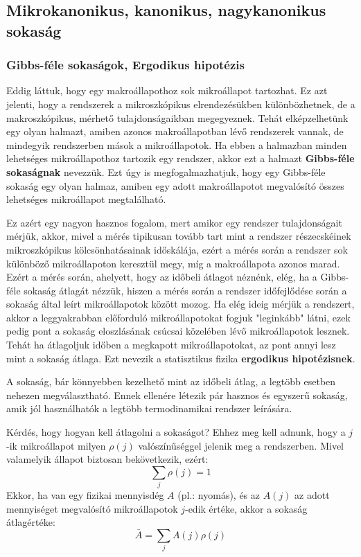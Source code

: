 \documentclass[../main.tex]{subfiles}
\begin{document}
\subsection{Mikrokanonikus, kanonikus, nagykanonikus sokaság}

\subsubsection{Gibbs-féle sokaságok, Ergodikus hipotézis}
Eddig láttuk, hogy egy makroállapothoz sok mikroállapot tartozhat. Ez azt jelenti, hogy a rendszerek a mikroszkópikus elrendezésükben különbözhetnek, de a makroszkópikus, mérhető tulajdonságaikban megegyeznek.
Tehát elképzelhetünk egy olyan halmazt, amiben azonos makroállapotban lévő rendszerek vannak, de mindegyik rendszerben mások a mikroállapotok. Ha ebben a halmazban minden lehetséges mikroállapothoz
tartozik egy rendszer, akkor ezt a halmazt \textbf{Gibbs-féle sokaságnak} nevezzük. Ezt úgy is megfogalmazhatjuk, hogy egy Gibbs-féle sokaság egy olyan halmaz, amiben egy adott makroállapotot megvalósító
összes lehetséges mikroállapot megtalálható.

Ez azért egy nagyon hasznos fogalom, mert amikor egy rendszer tulajdonságait mérjük, akkor, mivel a mérés tipikusan tovább tart mint a rendszer részecskéinek mikroszkópikus kölcsönhatásainak időskálája,
ezért a mérés során a rendszer sok különböző mikroállapoton keresztül megy, míg a makroállapota azonos marad. Ezért a mérés során, ahelyett, hogy az időbeli átlagot néznénk, elég, ha a Gibbs-féle sokaság
átlagát nézzük, hiszen a mérés során a rendszer időfejlődése során a sokaság által leírt mikroállapotok között mozog. Ha elég ideig mérjük a rendszert, akkor a leggyakrabban előforduló mikroállapotokat
fogjuk "leginkább" látni, ezek pedig pont a sokaság eloszlásának csúcsai közelében lévő mikroállapotok lesznek. Tehát ha átlagoljuk időben a megkapott mikroállapotokat, az pont annyi lesz mint a sokaság átlaga.
Ezt nevezik a statisztikus fizika \textbf{ergodikus hipotézisnek}.

A sokaság, bár könnyebben kezelhető mint az időbeli átlag, a legtöbb esetben nehezen megválasztható. Ennek ellenére létezik pár hasznos és egyszerű sokaság, amik jól használhatók a legtöbb termodinamikai rendszer leírására.

Kérdés, hogy hogyan kell átlagolni a sokaságot? Ehhez meg kell adnunk, hogy a $j$-ik mikroállapot milyen $\rho(j)$ valószínűséggel jelenik meg a rendszerben. Mivel valamelyik állapot biztosan bekövetkezik, ezért:
\begin{equation}
    \sum_j \rho(j) = 1
\end{equation}
Ekkor, ha van egy fizikai mennyisdég $A$ (pl.: nyomás), és az $A(j)$ az adott mennyiséget megvalósító mikroállapotok $j$-edik értéke, akkor a sokaság átlagértéke:
\begin{equation}
    \bar{A} = \sum_j A(j) \rho(j)
\end{equation}
\end{document}
